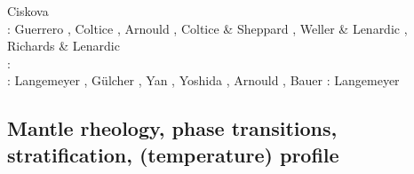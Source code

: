 \begin{scriptsize}
                       Ciskova \etal \cite{civj17}\\
\twothousandeighteen: Guerrero \etal \cite{guld18}, Coltice \etal \cite{cold18}, 
                      Arnould \etal \cite{arcf18}, Coltice \& Sheppard \cite{cosh18}, 
                      Weller \& Lenardic \cite{wele18}, Richards \& Lenardic \cite{rile18}\\
\twothousandnineteen: \cite{gult19}\cite{mazh19}\cite{cohf19}\cite{lewh19}\cite{ulcw19}\cite{boba19}\cite{fube19}
      \cite{plju19}\\
\twothousandtwenty: Langemeyer \etal \cite{lalt20}, G\"ulcher \etal \cite{gugb20}, 
                    Yan \etal \cite{yabt20}, Yoshida \etal \cite{yosy20}, 
                    Arnould \etal \cite{arcf20}, Bauer \etal \cite{babd20}
\twothousandone: Langemeyer \etal \cite{lalt21}
\end{scriptsize}

\subsection{Mantle rheology, phase transitions, stratification, (temperature) profile}

